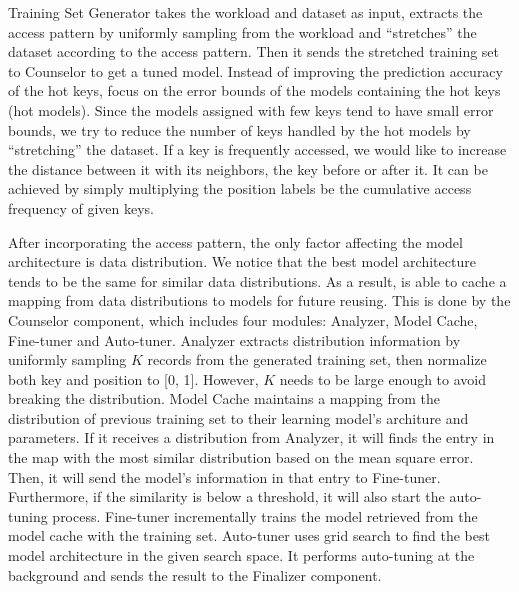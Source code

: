 \begin{bigabstract}
Training Set Generator takes the workload and dataset as input, extracts the access pattern by uniformly sampling from the workload and ``stretches'' the dataset according to the access pattern.
Then it sends the stretched training set to Counselor to get a tuned model.
Instead of improving the prediction accuracy of the hot keys, \sys focus on the error bounds of the models containing the hot keys (hot models).
Since the models assigned with few keys tend to have small error bounds, we try to reduce the number of keys handled by the hot models by ``stretching'' the dataset.
If a key is frequently accessed, we would like to increase the distance between it with its neighbors, the key before or after it.
It can be achieved by simply multiplying the position labels be the cumulative access frequency of given keys.

After incorporating the access pattern, the only factor affecting the model architecture is data distribution.
We notice that the best model architecture tends to be the same for similar data distributions.
As a result, \sys is able to cache a mapping from data distributions to models for future reusing.
This is done by the Counselor component, which includes four modules: Analyzer, Model Cache, Fine-tuner and Auto-tuner.
Analyzer extracts distribution information by uniformly sampling $K$ records from the generated training set, then normalize both key and position to [0, 1].
However, $K$ needs to be large enough to avoid breaking the distribution.
Model Cache maintains a mapping from the distribution of previous training set to their learning model's architure and parameters.
If it receives a distribution from Analyzer, it will finds the entry in the map with the most similar distribution based on the mean square error.
Then, it will send the model's information in that entry to Fine-tuner.
Furthermore, if the similarity is below a threshold, it will also start the auto-tuning process.
Fine-tuner incrementally trains the model retrieved from the model cache with the training set.
Auto-tuner uses grid search to find the best model architecture in the given search space.
It performs auto-tuning at the background and sends the result to the Finalizer component.


\end{bigabstract}
